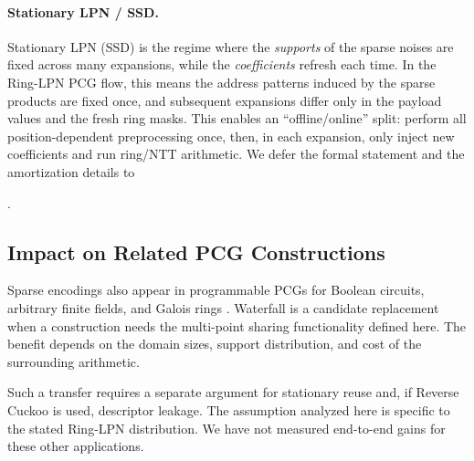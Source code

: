 \paragraph{Stationary LPN / SSD.}
Stationary LPN (SSD) \cite{Stationary} is the regime where the \emph{supports} of the sparse noises are fixed across many expansions, while the
\emph{coefficients} refresh each time. In the Ring-LPN PCG flow, this means the address patterns induced by the sparse products
are fixed once, and subsequent expansions differ only in the payload values and the fresh ring masks. This enables an
``offline/online'' split: perform all position-dependent preprocessing once, then, in each expansion, only inject new coefficients
and run ring/NTT arithmetic. We defer the formal statement and the amortization details to

.%

\fi




\subsection{Impact on Related PCG Constructions}\label{sec:impact}

Sparse encodings also appear in programmable PCGs for Boolean circuits,
arbitrary finite fields, and Galois rings
\cite{foleage,pcgQASD,anyField,pcgZ2k}.
Waterfall is a candidate replacement when a construction needs the
multi-point sharing functionality defined here.
The benefit depends on the domain sizes, support distribution, and cost of
the surrounding arithmetic.

Such a transfer requires a separate argument for stationary reuse and,
if Reverse Cuckoo is used, descriptor leakage. The assumption analyzed here
is specific to the stated Ring-LPN distribution. We have not measured
end-to-end gains for these other applications.
